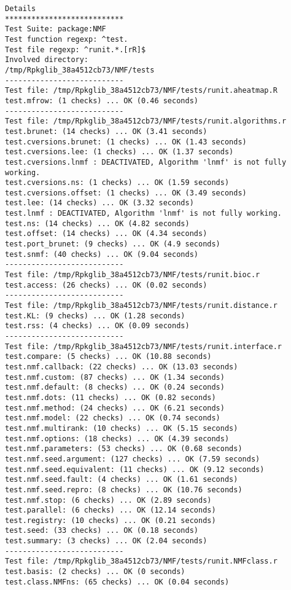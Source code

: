 \documentclass[10pt]{article}
\begin{document}
\begin{verbatim}
Details 
*************************** 
Test Suite: package:NMF 
Test function regexp: ^test. 
Test file regexp: ^runit.*.[rR]$ 
Involved directory: 
/tmp/Rpkglib_38a4512cb73/NMF/tests 
--------------------------- 
Test file: /tmp/Rpkglib_38a4512cb73/NMF/tests/runit.aheatmap.R 
test.mfrow: (1 checks) ... OK (0.46 seconds)
--------------------------- 
Test file: /tmp/Rpkglib_38a4512cb73/NMF/tests/runit.algorithms.r 
test.brunet: (14 checks) ... OK (3.41 seconds)
test.cversions.brunet: (1 checks) ... OK (1.43 seconds)
test.cversions.lee: (1 checks) ... OK (1.37 seconds)
test.cversions.lnmf : DEACTIVATED, Algorithm 'lnmf' is not fully working.
test.cversions.ns: (1 checks) ... OK (1.59 seconds)
test.cversions.offset: (1 checks) ... OK (3.49 seconds)
test.lee: (14 checks) ... OK (3.32 seconds)
test.lnmf : DEACTIVATED, Algorithm 'lnmf' is not fully working.
test.ns: (14 checks) ... OK (4.82 seconds)
test.offset: (14 checks) ... OK (4.34 seconds)
test.port_brunet: (9 checks) ... OK (4.9 seconds)
test.snmf: (40 checks) ... OK (9.04 seconds)
--------------------------- 
Test file: /tmp/Rpkglib_38a4512cb73/NMF/tests/runit.bioc.r 
test.access: (26 checks) ... OK (0.02 seconds)
--------------------------- 
Test file: /tmp/Rpkglib_38a4512cb73/NMF/tests/runit.distance.r 
test.KL: (9 checks) ... OK (1.28 seconds)
test.rss: (4 checks) ... OK (0.09 seconds)
--------------------------- 
Test file: /tmp/Rpkglib_38a4512cb73/NMF/tests/runit.interface.r 
test.compare: (5 checks) ... OK (10.88 seconds)
test.nmf.callback: (22 checks) ... OK (13.03 seconds)
test.nmf.custom: (87 checks) ... OK (1.34 seconds)
test.nmf.default: (8 checks) ... OK (0.24 seconds)
test.nmf.dots: (11 checks) ... OK (0.82 seconds)
test.nmf.method: (24 checks) ... OK (6.21 seconds)
test.nmf.model: (22 checks) ... OK (0.74 seconds)
test.nmf.multirank: (10 checks) ... OK (5.15 seconds)
test.nmf.options: (18 checks) ... OK (4.39 seconds)
test.nmf.parameters: (53 checks) ... OK (0.68 seconds)
test.nmf.seed.argument: (127 checks) ... OK (7.59 seconds)
test.nmf.seed.equivalent: (11 checks) ... OK (9.12 seconds)
test.nmf.seed.fault: (4 checks) ... OK (1.61 seconds)
test.nmf.seed.repro: (8 checks) ... OK (10.76 seconds)
test.nmf.stop: (6 checks) ... OK (2.89 seconds)
test.parallel: (6 checks) ... OK (12.14 seconds)
test.registry: (10 checks) ... OK (0.21 seconds)
test.seed: (33 checks) ... OK (0.18 seconds)
test.summary: (3 checks) ... OK (2.04 seconds)
--------------------------- 
Test file: /tmp/Rpkglib_38a4512cb73/NMF/tests/runit.NMFclass.r 
test.basis: (2 checks) ... OK (0 seconds)
test.class.NMFns: (65 checks) ... OK (0.04 seconds)

\end{verbatim}
\end{document}

